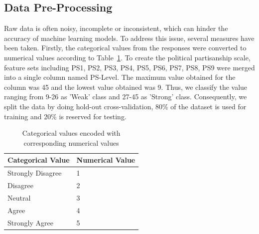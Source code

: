 \documentclass[pt]{article}  %
\begin{document}
\begin{figure}[H]
\begin{minipage}[b]{0.6\textwidth}
    \end{minipage}
\end{figure}
\subsection{\textbf{Data Pre-Processing }}Raw data is often noisy, incomplete or inconsistent, which can hinder the accuracy of machine learning models. To address this issue, several measures have been taken. Firstly, the categorical values from the responses were converted to numerical values according to Table~\ref{tab:table2}. To create the political partisanship scale, feature sets including PS1, PS2, PS3, PS4, PS5, PS6, PS7, PS8, PS9 were merged into a single column named PS-Level. The maximum value obtained for the column was 45 and the lowest value obtained was 9. Thus, we classify the value ranging from 9-26 as 'Weak' class and 27-45 as 'Strong' class. Consequently, we split the data by doing hold-out cross-validation, 80\% of the dataset is used for training and 20\% is reserved for testing.

\begin{table}[H]
\centering
\begin{tabular}{@{}ll@{}}
\toprule
\textbf{Categorical Value} & \textbf{Numerical Value} \\ \midrule
Strongly Disagree          &            1                        \\
Disagree                   &            2                        \\
Neutral                    &            3                        \\
Agree                      &            4                        \\
Strongly Agree             &            5                        \\ \bottomrule

\end{tabular}
\caption{Categorical values encoded with corresponding numerical values }
\label{tab:table2}
\end{table}
\end{document}
